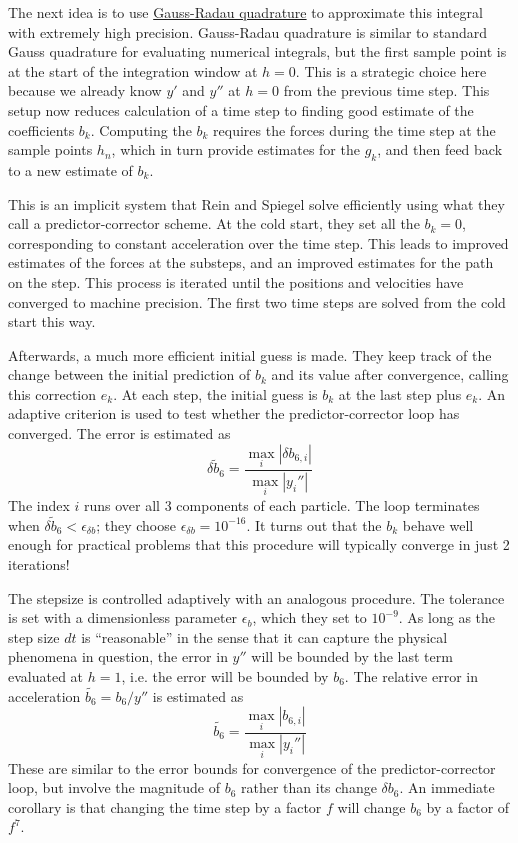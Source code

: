 The next idea is to use \href{http://mathworld.wolfram.com/RadauQuadrature.html}{Gauss-Radau quadrature}
to approximate this integral with extremely high precision.  
Gauss-Radau quadrature is similar to standard Gauss quadrature for evaluating numerical integrals, 
but the first sample point is at the start of the integration window at $h=0$.
This is a strategic choice here because we already know $y'$ and $y''$ at $h=0$ from the previous time step.
This setup now reduces calculation of a time step to finding good estimate of the coefficients $b_k$.
Computing the $b_k$ requires the forces during the time step at the sample points $h_n$,
which in turn provide estimates for the $g_k$, and then feed back to a new estimate of $b_k$.

This is an implicit system that Rein and Spiegel solve efficiently using what they call a predictor-corrector scheme.
At the cold start, they set all the $b_k=0$, corresponding to constant acceleration over the time step.
This leads to improved estimates of the forces at the substeps, and an improved estimates for the path on the step.
This process is iterated until the positions and velocities have converged to machine precision.
The first two time steps are solved from the cold start this way.  

Afterwards, a much more efficient initial guess is made.  
They keep track of the change between the initial prediction of $b_k$ and its value after convergence,
calling this correction $e_k$.  At each step, the initial guess is $b_k$ at the last step plus $e_k$.
An adaptive criterion is used to test whether the predictor-corrector loop has converged.
The error is estimated as 
$$\widetilde{\delta b_6} = \frac{\max_i |\delta b_{6,i}|}{\max_i |y_i''|}$$
The index $i$ runs over all 3 components of each particle.
The loop terminates when $ \widetilde{\delta b_6} < \epsilon_{\delta b}$; they choose $\epsilon_{\delta b} = 10^{-16}$.
It turns out that the $b_k$ behave well enough for practical problems that this procedure will
typically converge in just 2 iterations!

The stepsize is controlled adaptively with an analogous procedure.
The tolerance is set with a dimensionless parameter $\epsilon_b$,
which they set to $10^{-9}$.
As long as the step size $dt$ is ``reasonable'' in the sense that it can capture
the physical phenomena in question, the error in $y''$ will be bounded by the last term
evaluated at $h=1$, i.e. the error will be bounded by $b_6$.
The relative error in acceleration $\widetilde{b_6} = b_6 / y''$ is estimated as
$$ \widetilde{b_6} = \frac{\max_i |b_{6,i}|}{\max_i |y_i''|}$$
These are similar to the error bounds for convergence of the predictor-corrector loop,
but involve the magnitude of $b_6$ rather than its change $\delta b_6$.
An immediate corollary is that changing the time step by a factor $f$ will change $b_6$
by a factor of $f^7$.

